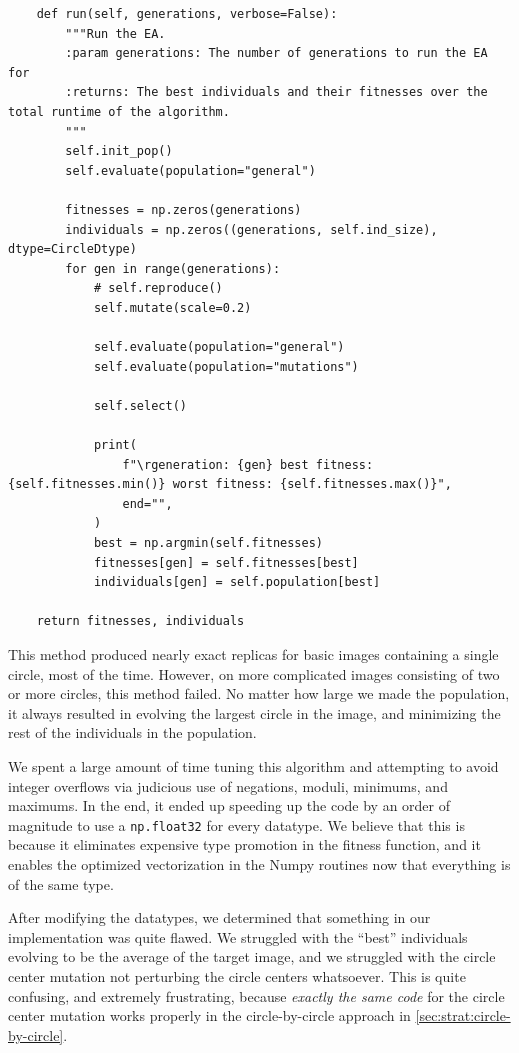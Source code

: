 \documentclass{article}
\begin{document}
\begin{verbatim}
    def run(self, generations, verbose=False):
        """Run the EA.
        :param generations: The number of generations to run the EA for
        :returns: The best individuals and their fitnesses over the total runtime of the algorithm.
        """
        self.init_pop()
        self.evaluate(population="general")

        fitnesses = np.zeros(generations)
        individuals = np.zeros((generations, self.ind_size), dtype=CircleDtype)
        for gen in range(generations):
            # self.reproduce()
            self.mutate(scale=0.2)

            self.evaluate(population="general")
            self.evaluate(population="mutations")

            self.select()

            print(
                f"\rgeneration: {gen} best fitness: {self.fitnesses.min()} worst fitness: {self.fitnesses.max()}",
                end="",
            )
            best = np.argmin(self.fitnesses)
            fitnesses[gen] = self.fitnesses[best]
            individuals[gen] = self.population[best]

    return fitnesses, individuals
\end{verbatim}

This method produced nearly exact replicas for basic images containing a single circle, most of the time. However, on more complicated images consisting of two or more circles, this method failed. No matter how large we made the population, it always resulted in evolving the largest circle in the image, and minimizing the rest of the individuals in the population.

We spent a large amount of time tuning this algorithm and attempting to avoid integer overflows via judicious use of negations, moduli, minimums, and maximums. In the end, it ended up speeding up the code by an order of magnitude to use a \texttt{np.float32} for every datatype. We believe that this is because it eliminates expensive type promotion in the fitness function, and it enables the optimized vectorization in the Numpy routines now that everything is of the same type.

After modifying the datatypes, we determined that something in our implementation was quite flawed. We struggled with the ``best'' individuals evolving to be the average of the target image, and we struggled with the circle center mutation not perturbing the circle centers whatsoever. This is quite confusing, and extremely frustrating, because \textit{exactly the same code} for the circle center mutation works properly in the circle-by-circle approach in \autoref{sec:strat:circle-by-circle}.
\end{document}
